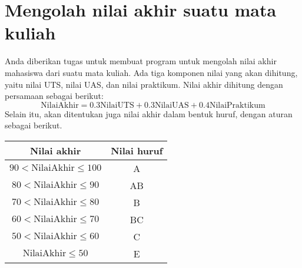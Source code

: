 \documentclass[a4paper,11pt]{extarticle}
\begin{document}
\section{Mengolah nilai akhir suatu mata kuliah}
Anda diberikan tugas untuk membuat program untuk mengolah nilai akhir mahasiswa
dari suatu mata kuliah. Ada tiga komponen nilai yang akan dihitung, yaitu nilai UTS,
nilai UAS, dan nilai praktikum. Nilai akhir dihitung dengan persamaan sebagai
berikut:
\begin{equation}
\mathrm{NilaiAkhir} = 0.3\mathrm{NilaiUTS} + 0.3\textrm{NilaiUAS} + 0.4\textrm{NilaiPraktikum}
\end{equation}
%
Selain itu, akan ditentukan juga nilai akhir dalam bentuk huruf, dengan aturan sebagai
berikut.

{\centering
\begin{tabular}{|c|c|}
\hline
Nilai akhir & Nilai huruf \\
\hline
$90 < \mathrm{NilaiAkhir} \leq 100$ & A \\
$80 < \mathrm{NilaiAkhir} \leq 90$ & AB \\
$70 < \mathrm{NilaiAkhir} \leq 80$ & B \\
$60 < \mathrm{NilaiAkhir} \leq 70$ & BC \\
$50 < \mathrm{NilaiAkhir} \leq 60$ & C \\
$\mathrm{NilaiAkhir} \leq 50$ & E \\
\hline
\end{tabular}
\par}
\end{document}

